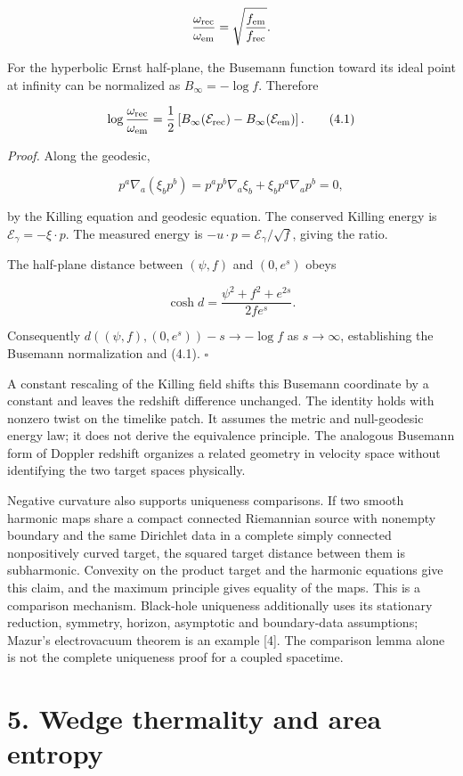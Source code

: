 \documentclass[
  11pt,
  a4paper,
]{article}
\newcounter{none} %
\begin{document}
\[
\frac{\omega_{\rm rec}}{\omega_{\rm em}}
=\sqrt{\frac{f_{\rm em}}{f_{\rm rec}}}.
\]

For the hyperbolic Ernst half-plane, the Busemann function toward its ideal point at infinity can be normalized as \(B_\infty=-\log f\). Therefore

\[
\log\frac{\omega_{\rm rec}}{\omega_{\rm em}}
=\frac12\left[B_\infty(\mathcal E_{\rm rec})
-B_\infty(\mathcal E_{\rm em})\right].
\tag{4.1}
\]

\emph{Proof.} Along the geodesic,

\[
p^a\nabla_a(\xi_bp^b)
=p^ap^b\nabla_a\xi_b+\xi_bp^a\nabla_ap^b=0,
\]

by the Killing equation and geodesic equation. The conserved Killing energy is \(\mathcal E_\gamma=-\xi\cdot p\). The measured energy is \(-u\cdot p=\mathcal E_\gamma/\sqrt f\), giving the ratio.

The half-plane distance between \((\psi,f)\) and \((0,e^s)\) obeys

\[
\cosh d=\frac{\psi^2+f^2+e^{2s}}{2fe^s}.
\]

Consequently \(d((\psi,f),(0,e^s))-s\to-\log f\) as \(s\to\infty\), establishing the Busemann normalization and (4.1). \(\square\)

A constant rescaling of the Killing field shifts this Busemann coordinate by a constant and leaves the redshift difference unchanged. The identity holds with nonzero twist on the timelike patch. It assumes the metric and null-geodesic energy law; it does not derive the equivalence principle. The analogous Busemann form of Doppler redshift organizes a related geometry in velocity space without identifying the two target spaces physically.

Negative curvature also supports uniqueness comparisons. If two smooth harmonic maps share a compact connected Riemannian source with nonempty boundary and the same Dirichlet data in a complete simply connected nonpositively curved target, the squared target distance between them is subharmonic. Convexity on the product target and the harmonic equations give this claim, and the maximum principle gives equality of the maps. This is a comparison mechanism. Black-hole uniqueness additionally uses its stationary reduction, symmetry, horizon, asymptotic and boundary-data assumptions; Mazur's electrovacuum theorem is an example {[}4{]}. The comparison lemma alone is not the complete uniqueness proof for a coupled spacetime.

\section{5. Wedge thermality and area entropy}\label{wedge-thermality-and-area-entropy}
\end{document}
